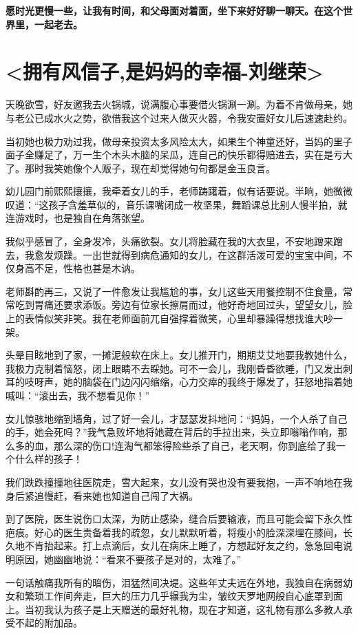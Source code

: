 \documentclass[UTF8,a4paper,8pt]{ctexart}
\begin{document}
 \textbf{愿时光更慢一些，让我有时间，和父母面对着面，坐下来好好聊一聊天。在这个世界里，一起老去。}
 
 
 \newpage
 \section{<拥有风信子,是妈妈的幸福-刘继荣>}
 天晚欲雪，好友邀我去火锅城，说满腹心事要借火锅涮一涮。为着不肯做母亲，她与老公已成水火之势，欲借我这个过来人做灭火器，令我安置好女儿后速速赴约。
 
 当初她也极力劝过我，做母亲投资太多风险太大，如果生个神童还好，当妈的里子面子全赚足了，万一生个木头木脑的呆瓜，连自己的快乐都得赔进去，实在是亏大了。那时我笑她像个人贩子，现在却觉得她句句都是金玉良言。
 
 幼儿园门前熙熙攘攘，我牵着女儿的手，老师踌躇着，似有话要说。半晌，她微微叹道：“这孩子含羞草似的，音乐课嘴闭成一枚坚果，舞蹈课总比别人慢半拍，就连游戏时，也是独自在角落张望。
 
 我似乎感冒了，全身发冷，头痛欲裂。女儿将脸藏在我的大衣里，不安地蹭来蹭去，我愈发烦躁。一出世就得到病危通知的女儿，在这群活泼可爱的宝宝中间，不仅身高不足，性格也甚是木讷。
 
 老师斟酌再三，又说了一件愈发让我尴尬的事，女儿这些天用餐控制不住食量，常常吃到胃痛还要求添饭。旁边有位家长擦肩而过，他好奇地回过头，望望女儿，脸上的表情似笑非笑。我在老师面前兀自强撑着微笑，心里却暴躁得想找谁大吵一架。
 
 头晕目眩地到了家，一摊泥般软在床上。女儿推开门，期期艾艾地要我教她什么，我极力克制着恼怒，闭上眼睛不去睬她。可不一会儿，我刚昏昏欲睡，门又发出刺耳的吱呀声，她的脑袋在门边闪闪缩缩，心力交瘁的我终于爆发了，狂怒地指着她喊叫：“滚出去，我不想看见你！”
 
 女儿惊骇地缩到墙角，过了好一会儿，才瑟瑟发抖地问：“妈妈，一个人杀了自己的手，她会死吗？”我气急败坏地将她藏在背后的手拉出来，头立即嗡嗡作响，那么多的血，那么深的伤口!连淘气都笨得险些杀了自己，老天啊，你到底给了我一个什么样的孩子！
 
 我们跌跌撞撞地往医院走，雪大起来，女儿没有哭也没有要我抱，一声不响地在我身后紧追慢赶，看来她也知道自己闯了大祸。
 
 到了医院，医生说伤口太深，为防止感染，缝合后要输液，而且可能会留下永久性疤痕。好心的医生责备着我的疏忽，女儿默默听着，将瘦小的脸深深埋在膝间，长久地不肯抬起来。打上点滴后，女儿在病床上睡了，方想起好友之约，急急回电说明原因，她幽幽地说：“看来不要孩子是对的，太难了。”
 
 一句话触痛我所有的暗伤，泪猛然间决堤。这些年丈夫远在外地，我独自在病弱幼女和繁琐工作间奔走，巨大的压力几乎辗我为尘，皱纹天罗地网般自心底罩到面上。当初我认为孩子是上天赠送的最好礼物，现在才知道，这礼物有那么多教人承受不起的附加品。
 
\end{document}
